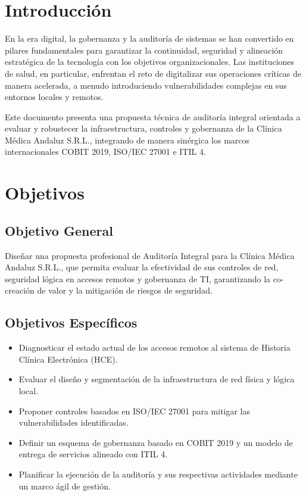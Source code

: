 \section{Introducción}
En la era digital, la gobernanza y la auditoría de sistemas se han convertido en pilares fundamentales para garantizar la continuidad, seguridad y alineación estratégica de la tecnología con los objetivos organizacionales. Las instituciones de salud, en particular, enfrentan el reto de digitalizar sus operaciones críticas de manera acelerada, a menudo introduciendo vulnerabilidades complejas en sus entornos locales y remotos.

Este documento presenta una propuesta técnica de auditoría integral orientada a evaluar y robustecer la infraestructura, controles y gobernanza de la Clínica Médica Andaluz S.R.L., integrando de manera sinérgica los marcos internacionales COBIT 2019, ISO/IEC 27001 e ITIL 4.

\section{Objetivos}

\subsection{Objetivo General}
Diseñar una propuesta profesional de Auditoría Integral para la Clínica Médica Andaluz S.R.L., que permita evaluar la efectividad de sus controles de red, seguridad lógica en accesos remotos y gobernanza de TI, garantizando la co-creación de valor y la mitigación de riesgos de seguridad.

\subsection{Objetivos Específicos}
\begin{itemize}
    \item Diagnosticar el estado actual de los accesos remotos al sistema de Historia Clínica Electrónica (HCE).
    \item Evaluar el diseño y segmentación de la infraestructura de red física y lógica local.
    \item Proponer controles basados en ISO/IEC 27001 para mitigar las vulnerabilidades identificadas.
    \item Definir un esquema de gobernanza basado en COBIT 2019 y un modelo de entrega de servicios alineado con ITIL 4.
    \item Planificar la ejecución de la auditoría y sus respectivas actividades mediante un marco ágil de gestión.
\end{itemize}
